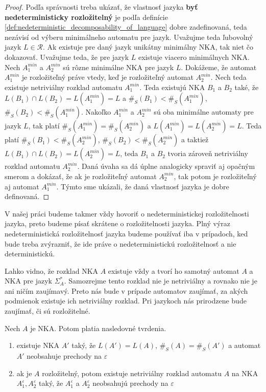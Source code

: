 \begin{proof}
Podľa správnosti treba ukázať, že vlastnosť jazyka \textbf{byť nedeterministicky rozložitelný} je podľa definície \ref{def:nedeterministic_decomposability_of_language} dobre zadefinovaná, teda nezávisí od výberu minimálneho automatu pre jazyk. Uvažujme teda ľubovolný jazyk $ L \in \mathscr{R} $. Ak existuje pre daný jazyk unikátny minimálny NKA, tak niet čo dokazovať. Uvažujme teda, že pre jazyk $ L $ existuje viacero minimálnych NKA. Nech $ A_1^{min} $ a $ A_2^{min} $ sú rôzne minimálne NKA pre jazyk $ L $. Dokážeme, že automat $ A_1^{min} $ je rozložiteľný práve vtedy, keď je rozložiteľný automat $ A_2^{min} $. Nech teda existuje netriviálny rozklad automatu $ A_1^{min} $. Teda existujú NKA $ B_1 $ a $ B_2 $ také, že $ L(B_1) \cap L(B_2) = L(A_1^{min}) = L $ a $ \#_S(B_1) < \#_S(A_1^{min}) $, $ \#_S(B_2) < \#_S(A_1^{min}) $. Nakoľko $ A_1^{min} $ a $ A_2^{min} $ sú oba minimálne automaty pre jazyk $ L $, tak platí $ \#_S(A_1^{min}) = \#_S(A_2^{min}) $ a $ L(A_1^{min}) = L(A_2^{min}) = L $. Teda platí $ \#_S(B_1) < \#_S(A_2^{min}) $, $ \#_S(B_2) < \#_S(A_2^{min}) $ a taktiež $ L(B_1) \cap L(B_2) = L(A_2^{min}) = L $, teda $ B_1 $ a $ B_2 $ tvoria zároveň netriviálny rozklad automatu $ A_2^{min} $. Daná úvaha sa dá úplne analogicky spraviť aj opačným smerom a dokázať, že ak je rozložiteľný automat $ A_2^{min} $, tak potom je rozložiteľný aj automat $ A_1^{min} $. Týmto sme ukázali, že daná vlastnosť jazyka je dobre definovaná.
\end{proof}

\begin{note}
V našej práci budeme takmer vždy hovoriť o nedeterministickej rozložitelnosti jazyka, preto budeme písať skrátene o rozložitelnosti jazyka. Plný výraz nedeterministická rozložitelnosť jazyka budeme používať iba v prípadoch, ked bude treba zvýrazniť, že ide práve o nedeterministickú rozložitelnosť a nie deterministickú.
\end{note}

Lahko vidno, že rozklad NKA $ A $ existuje vždy a tvorí ho samotný automat $ A $ a NKA pre jazyk $ \Sigma_A^{*} $. Samozrejme tento rozklad nie je netriviálny a rovnako nie je ani ničím zaujímavý. Preto nás bude v prípade automatov zaujímať, za akých podmienok existuje ich netriviálny rozklad. Pri jazykoch nás prirodzene bude zaujímať, či sú rozložitelné.
\par

\begin{lemma}
\label{lm:nonepsilon_NFA}
Nech $ A $ je NKA. Potom platia nasledovné tvrdenia.

\begin{enumerate}
\item \label{lm:nonepsilon_NFA_1} existuje NKA $ A' $ taký, že $ L(A')=L(A) $, $ \#_S(A)=\#_S(A') $ a automat $ A' $ neobsahuje prechody na $ \varepsilon $
\item \label{lm:nonepsilon_NFA_2} ak je $ A $ rozložitelný, potom existuje netriviálny rozklad automatu $ A $ na NKA $ A_1^{\varepsilon}, A_2^{\varepsilon} $ taký, že $ A_1^{\varepsilon} $ a $ A_2^{\varepsilon} $ neobsahujú prechody na $ \varepsilon $
\end{enumerate}
\end{lemma}

